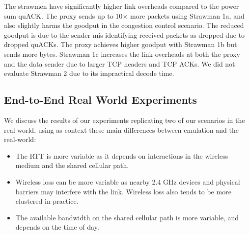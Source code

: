 The strawmen have significantly higher link overheads compared to the power sum
quACK\@. The proxy sends up to 10$\times$ more packets using Strawman 1a, and
also slightly harms the goodput in the congestion control scenario.
The reduced goodput is due to the sender mis-identifying received packets as
dropped due to dropped quACKs.
The proxy achieves higher goodput with Strawman 1b but sends
more bytes. Strawman 1c increases the link overheads at both the proxy and the
data sender due to larger TCP headers and TCP ACKs.
We did not evaluate Strawman 2 due to its impractical decode time.

\subsection{End-to-End Real World Experiments}



We discuss the results of our experiments replicating two of our scenarios in
the real world, using as context
these main differences between emulation and the real-world:


\begin{itemize}[noitemsep,topsep=0pt]
	\item The RTT is more variable as it depends on interactions in the
	wireless medium and the shared cellular path.
	\item Wireless loss can be more variable as nearby 2.4 GHz devices and
	physical barriers may interfere with the link. Wireless loss also tends
	to be more clustered in practice.
	\item The available bandwidth on the shared cellular path is more variable,
	and depends on the time of day.
\end{itemize}

